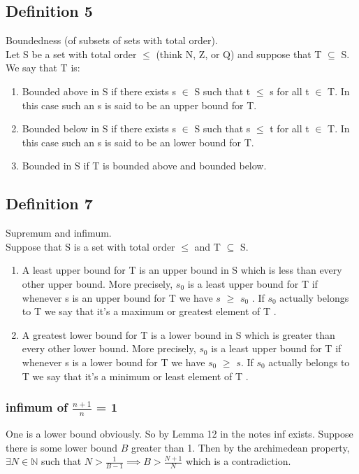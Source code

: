 \documentclass{article}
\begin{document}
\subsection{Definition 5}
Boundedness (of subsets of sets with total order). \\
\newline
Let S be a set with total order $\leq$ (think N, Z, or Q) and suppose that
T $\subseteq$ S. We say that T is:
\begin{enumerate}
\item Bounded above in S if there exists s $\in$ S such that t $\leq$ s for all t $\in$ T. In this
case such an s is said to be an upper bound for T.
\item Bounded below in S if there exists s $\in$ S such that s $\leq$ t for all t $\in$ T. In this
case such an s is said to be an lower bound for T.
\item Bounded in S if T is bounded above and bounded below.
\end{enumerate}


\subsection{Definition 7}
Supremum and infimum. \\
\newline
Suppose that S is a set with total order $\leq$ and T $\subseteq$ S.
\begin{enumerate}
\item A least upper bound for T is an upper bound in S which is less than every
other upper bound. More precisely, $s_0$ is a least upper bound for T if whenever s
is an upper bound for T we have $s$ $\geq$ $s_0$ .
If $s_0$ actually belongs to T we say that
it’s a maximum or greatest element of T .
\item A greatest lower bound for T is a lower bound in S which is greater than every
other lower bound. More precisely, $s_0$ is a least upper bound for T if whenever s
is a lower bound for T we have $s_0$ $\geq$ $s$. If $s_0$ actually belongs to T we say that
it’s a minimum or least element of T .
\end{enumerate}
\subsubsection{infimum of $\frac{n+1}{n}$ = 1}
One is a lower bound obviously. So by Lemma 12 in the notes inf exists.
Suppose there is some lower bound $B$ greater than 1. Then by the archimedean
property, $\exists N \in \mathbb{N}$ such that $N>\frac{1}{B-1} \implies B > \frac{N+1}{N}$
which is a contradiction.
\end{document}
